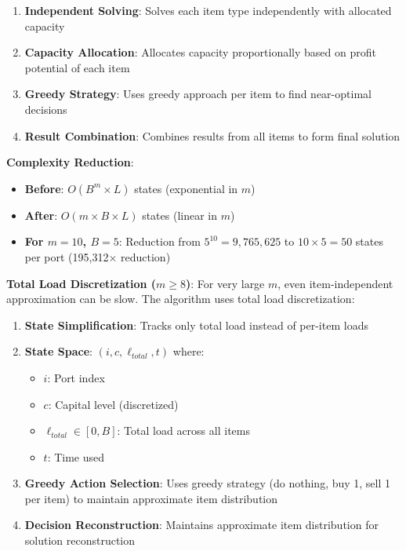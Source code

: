 \documentclass[12pt]{article}
\begin{document}
\begin{enumerate}
    \item \textbf{Independent Solving}: Solves each item type independently with allocated capacity
    \item \textbf{Capacity Allocation}: Allocates capacity proportionally based on profit potential of each item
    \item \textbf{Greedy Strategy}: Uses greedy approach per item to find near-optimal decisions
    \item \textbf{Result Combination}: Combines results from all items to form final solution
\end{enumerate}

\textbf{Complexity Reduction}: 
\begin{itemize}
    \item \textbf{Before}: $O(B^m \times L)$ states (exponential in $m$)
    \item \textbf{After}: $O(m \times B \times L)$ states (linear in $m$)
    \item \textbf{For $m=10$, $B=5$}: Reduction from $5^{10} = 9,765,625$ to $10 \times 5 = 50$ states per port (195,312$\times$ reduction)
\end{itemize}

\textbf{Total Load Discretization ($m \geq 8$)}: For very large $m$, even item-independent approximation can be slow. The algorithm uses total load discretization:

\begin{enumerate}
    \item \textbf{State Simplification}: Tracks only total load instead of per-item loads
    \item \textbf{State Space}: $(i, c, \ell_{total}, t)$ where:
    \begin{itemize}
        \item $i$: Port index
        \item $c$: Capital level (discretized)
        \item $\ell_{total} \in [0, B]$: Total load across all items
        \item $t$: Time used
    \end{itemize}
    \item \textbf{Greedy Action Selection}: Uses greedy strategy (do nothing, buy 1, sell 1 per item) to maintain approximate item distribution
    \item \textbf{Decision Reconstruction}: Maintains approximate item distribution for solution reconstruction
\end{enumerate}
\end{document}
